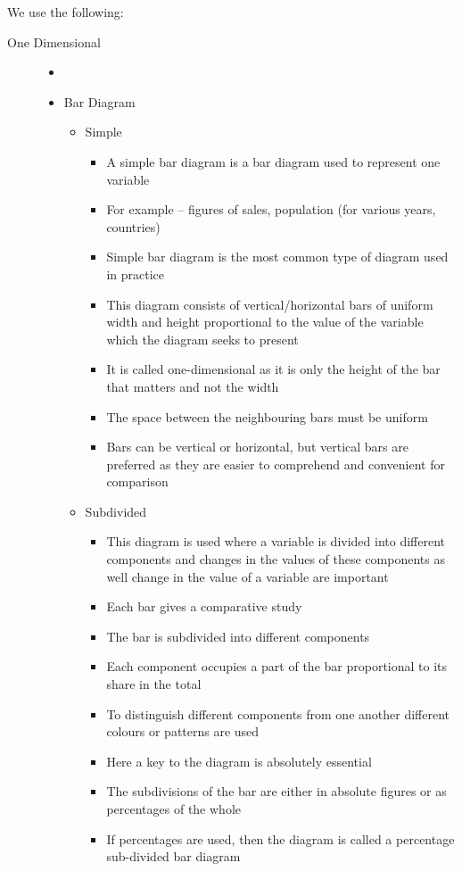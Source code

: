 \documentclass[
10pt, %
a4paper, %
]{report}
\begin{document}
We use the following:
\begin{description}
\item[One Dimensional]
\begin{itemize}
\item[]
\item Bar Diagram
\begin{itemize}
\item Simple
\begin{itemize}
\item A simple bar diagram is a bar diagram used to represent one variable
\item For example – figures of sales, population (for various years, countries)
\item Simple bar diagram is the most common type of diagram used in practice
\item This diagram consists of vertical/horizontal bars of uniform width and height proportional to the value of the variable which the diagram seeks to present
\item It is called one-dimensional as it is only the height of the bar that matters and not the width
\item The space between the neighbouring bars must be uniform
\item Bars can be vertical or horizontal, but vertical bars are preferred as they are easier to comprehend and convenient for comparison
\end{itemize}
\item Subdivided
\begin{itemize}
\item This diagram is used where a variable is divided into different components and changes in the values of these components as well change in the value of a variable are important
\item Each bar gives a comparative study
\item The bar is subdivided into different components
\item Each component occupies a part of the bar proportional to its share in the total
\item To distinguish different components from one another different colours or patterns are used
\item Here a key to the diagram is absolutely essential
\item The subdivisions of the bar are either in absolute figures or as percentages of the whole
\item If percentages are used, then the diagram is called a percentage sub-divided bar diagram

\end{itemize}
\end{itemize}
\end{itemize}
\end{description}
\end{document}
